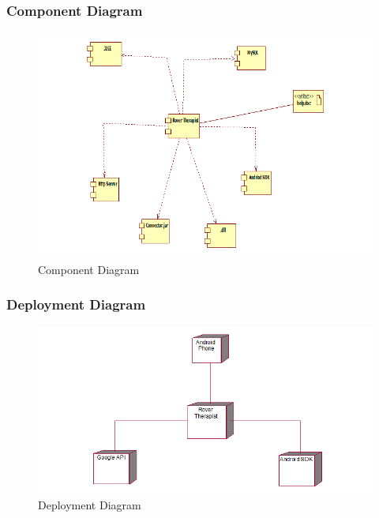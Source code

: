 \documentclass[12pt,a4paper]{article}
\begin{document}
{{{{{{\subsubsection{Component Diagram}
\begin{figure}[!htb]
\centering
\includegraphics[width=15 cm]{component}
\caption{Component Diagram}
\end{figure}
\newpage
\subsubsection{Deployment Diagram}
\begin{figure}[!htb]
\centering
\includegraphics[width=15 cm]{deployment}
\caption{Deployment Diagram}
\end{figure}

\newpage
\begin{center}

\end{center}}}}}}}
\end{document}
